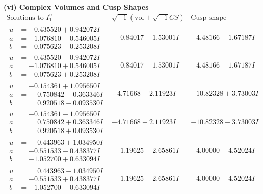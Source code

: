 \documentclass[1p]{elsarticle_modified}
\theoremstyle{definition}
\newcommand{\I}{\sqrt{-1}}
\begin{document}
\newpage\flushleft \textbf{(vi) Complex Volumes and Cusp Shapes}
$$\begin{array}{c|c|c}  
\text{Solutions to }I^u_{1}& \I (\text{vol} + \sqrt{-1}CS) & \text{Cusp shape}\\
 \hline 
\begin{aligned}
u &= -0.435520 + 0.942072 I \\
a &= -1.076810 - 0.546005 I \\
b &= -0.075623 - 0.253208 I\end{aligned}
 & \phantom{-}0.84017 + 1.53001 I & -4.48166 - 1.67187 I \\ \hline\begin{aligned}
u &= -0.435520 - 0.942072 I \\
a &= -1.076810 + 0.546005 I \\
b &= -0.075623 + 0.253208 I\end{aligned}
 & \phantom{-}0.84017 - 1.53001 I & -4.48166 + 1.67187 I \\ \hline\begin{aligned}
u &= -0.154361 + 1.095650 I \\
a &= \phantom{-}0.750842 - 0.363346 I \\
b &= \phantom{-}0.920518 - 0.093530 I\end{aligned}
 & -4.71668 - 2.11923 I & -10.82328 + 3.73003 I \\ \hline\begin{aligned}
u &= -0.154361 - 1.095650 I \\
a &= \phantom{-}0.750842 + 0.363346 I \\
b &= \phantom{-}0.920518 + 0.093530 I\end{aligned}
 & -4.71668 + 2.11923 I & -10.82328 - 3.73003 I \\ \hline\begin{aligned}
u &= \phantom{-}0.443963 + 1.034950 I \\
a &= -0.551533 - 0.438377 I \\
b &= -1.052700 + 0.633094 I\end{aligned}
 & \phantom{-}1.19625 + 2.65861 I & -4.00000 - 4.52024 I \\ \hline\begin{aligned}
u &= \phantom{-}0.443963 - 1.034950 I \\
a &= -0.551533 + 0.438377 I \\
b &= -1.052700 - 0.633094 I\end{aligned}
 & \phantom{-}1.19625 - 2.65861 I & -4.00000 + 4.52024 I \\ \hline\begin{aligned}

\end{aligned}
\end{array}$$
\end{document}
